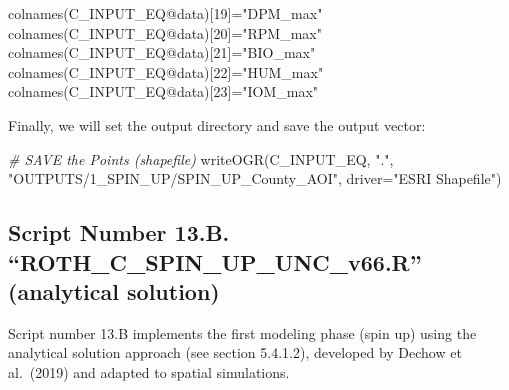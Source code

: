 \documentclass[
  10pt,
  b5paper,
]{book}
\newenvironment{Shaded}{\begin{snugshade}}{\end{snugshade}}
\newcommand{\AttributeTok}[1]{\textcolor[rgb]{0.77,0.63,0.00}{#1}}
\newcommand{\CommentTok}[1]{\textcolor[rgb]{0.56,0.35,0.01}{\textit{#1}}}
\newcommand{\DecValTok}[1]{\textcolor[rgb]{0.00,0.00,0.81}{#1}}
\newcommand{\FunctionTok}[1]{\textcolor[rgb]{0.00,0.00,0.00}{#1}}
\newcommand{\NormalTok}[1]{#1}
\newcommand{\OtherTok}[1]{\textcolor[rgb]{0.56,0.35,0.01}{#1}}
\newcommand{\SpecialCharTok}[1]{\textcolor[rgb]{0.00,0.00,0.00}{#1}}
\newcommand{\StringTok}[1]{\textcolor[rgb]{0.31,0.60,0.02}{#1}}
\begin{document}
\begin{Shaded}
\begin{Highlighting}[]
\FunctionTok{colnames}\NormalTok{(C\_INPUT\_EQ}\SpecialCharTok{@}\NormalTok{data)[}\DecValTok{19}\NormalTok{]}\OtherTok{=}\StringTok{"DPM\_max"}
\FunctionTok{colnames}\NormalTok{(C\_INPUT\_EQ}\SpecialCharTok{@}\NormalTok{data)[}\DecValTok{20}\NormalTok{]}\OtherTok{=}\StringTok{"RPM\_max"}
\FunctionTok{colnames}\NormalTok{(C\_INPUT\_EQ}\SpecialCharTok{@}\NormalTok{data)[}\DecValTok{21}\NormalTok{]}\OtherTok{=}\StringTok{"BIO\_max"}
\FunctionTok{colnames}\NormalTok{(C\_INPUT\_EQ}\SpecialCharTok{@}\NormalTok{data)[}\DecValTok{22}\NormalTok{]}\OtherTok{=}\StringTok{"HUM\_max"}
\FunctionTok{colnames}\NormalTok{(C\_INPUT\_EQ}\SpecialCharTok{@}\NormalTok{data)[}\DecValTok{23}\NormalTok{]}\OtherTok{=}\StringTok{"IOM\_max"}
\end{Highlighting}
\end{Shaded}

Finally, we will set the output directory and save the output vector:

\begin{Shaded}
\begin{Highlighting}[]
 \CommentTok{\# SAVE the Points (shapefile)}
\FunctionTok{writeOGR}\NormalTok{(C\_INPUT\_EQ, }\StringTok{"."}\NormalTok{, }\StringTok{"OUTPUTS/1\_SPIN\_UP/SPIN\_UP\_County\_AOI"}\NormalTok{, }\AttributeTok{driver=}\StringTok{"ESRI Shapefile"}\NormalTok{) }
\end{Highlighting}
\end{Shaded}

\hypertarget{script-number-13.b.-roth_c_spin_up_unc_v66.r-analytical-solution}{%
\subsection{Script Number 13.B. ``ROTH\_C\_SPIN\_UP\_UNC\_v66.R'' (analytical solution)}\label{script-number-13.b.-roth_c_spin_up_unc_v66.r-analytical-solution}}

Script number 13.B implements the first modeling phase (spin up) using the analytical solution approach (see section 5.4.1.2), developed by Dechow et al.~(2019) and adapted to spatial simulations.
\end{document}
